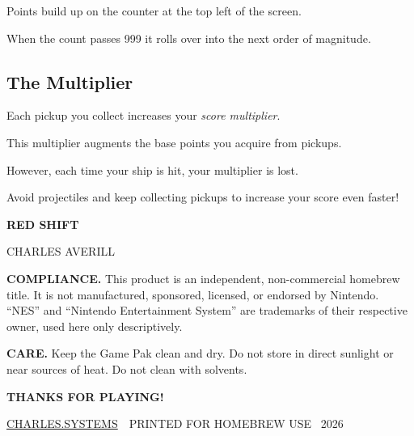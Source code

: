 \documentclass[10pt]{article}
\newcommand{\GameTitle}{RED SHIFT}
\newcommand{\GameByline}{CHARLES AVERILL}
\newcommand{\GameSite}{\href{https://charles.systems/}{CHARLES.SYSTEMS}}
\newcommand{\GameYear}{2026}
\begin{document}
Points build up on the counter at the top left of the screen.

When the count passes 999 it rolls over into the next order of magnitude.

\vspace{4pt}
\subsection*{The Multiplier}

Each pickup you collect increases your \emph{score multiplier}.

This multiplier augments the base points you acquire from pickups.

However, each time your ship is hit, your multiplier is lost.

Avoid projectiles and keep collecting pickups to increase your score even faster!

\clearpage

\thispagestyle{empty}
\vspace*{0.4in}
\begin{center}
{\Large\bfseries\color{nesred}\GameTitle}

\vspace{4pt}
{\footnotesize \GameByline}
\end{center}

\vfill

{\footnotesize
\textbf{COMPLIANCE.}
This product is an independent, non-commercial homebrew title.
It is not manufactured, sponsored, licensed, or endorsed by Nintendo.
``NES'' and ``Nintendo Entertainment System'' are trademarks of their respective owner, used here only descriptively.

\vspace{6pt}
\textbf{CARE.}
Keep the Game Pak clean and dry.
Do not store in direct sunlight or near sources of heat.
Do not clean with solvents.

\vspace{6pt}
\textbf{THANKS FOR PLAYING!}}

\vfill
\begin{center}
{\scriptsize \GameSite\ \textbullet\ PRINTED FOR HOMEBREW USE \textbullet\ \GameYear}
\end{center}
\clearpage
\end{document}
